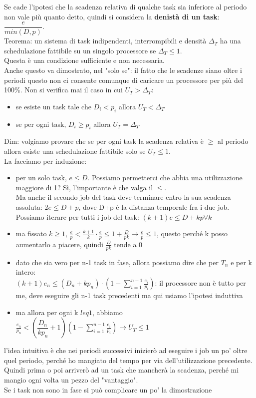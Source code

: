 \documentclass[12pt, oneside]{extbook}
\begin{document}
Se cade l'ipotesi che la scadenza relativa di qualche task sia inferiore al periodo non vale più quanto detto, quindi si considera la \textbf{denistà di un task}: $\dfrac{e}{min(D,p)}$.\\
Teorema: un sistema di task indipendenti, interrompibili e densità $\Delta_T$ ha una schedulazione fattibile su un singolo processore se $\Delta_T \leq 1$.\\
Questa è una condizione sufficiente e non necessaria.\\
Anche questo va dimostrato, nel "solo se": il fatto che le scadenze siano oltre i periodi questo non ci consente comunque di caricare un processore per più del 100\%.
Non si verifica mai il caso in cui $U_T > \Delta_T$:
\begin{itemize}
	\item se esiste un task tale che $D_i < p_i$ allora $U_T < \Delta_T$
	\item se per ogni task, $D_i \geq p_i$ allora $U_T = \Delta_T$
\end{itemize}
Dim: volgiamo provare che se per ogni task la scadenza relativa è $\geq$ al periodo allora esiste una schedulazione fattibile solo se $U_T \leq 1$.\\
La facciamo per induzione:
\begin{itemize}
	\item per un solo task, $e \leq D$. Possiamo permetterci che abbia una utilizzazione maggiore di 1? Sì, l'importante è che valga il $\leq$.\\
	Ma anche il secondo job del task deve terminare entro la sua scadenza assoluta: $2e \leq D + p$, dove D+p è la distanza temporale fra i due job.\\
	Possiamo iterare per tutti i job del task: $(k+1)e \leq D + kp \forall k$
	\item ma fissato $k \geq 1$, $\frac{e}{p} < \frac{k+1}{k} \cdot \frac{e}{p} \leq 1 + \frac{D}{pk} \rightarrow \frac{e}{p} \leq 1$, questo perché k posso aumentarlo a piacere, quindi $\frac{D}{pk}$ tende a 0
	\item dato che sia vero per n-1 task in fase, allora possiamo dire che per $T_n$ e per k intero:\\
	$(k+1)e_n \leq (D_n + k p_n) \cdot (1 - \sum_{i=1}^{n-1} \frac{e_i}{p_i})$: il processore non è tutto per me, deve eseguire gli n-1 task precedenti ma qui usiamo l'ipotesi induttiva
	\item ma allora per ogni k $leq 1$, abbiamo $\frac{e_n}{p_n} < (\dfrac{D_n}{k p_n} + 1) (1 - \sum_{i=1}^{n-1} \frac{e_i}{p_i}) \rightarrow U_T \leq 1$
\end{itemize} 
l'idea intuitiva è che nei periodi successivi inizierò ad eseguire i job un po' oltre quel periodo, perché ho mangiato del tempo per via dell'utilizzazione precedente.\\
Quindi prima o poi arriverò ad un task che mancherà la scadenza, perché mi mangio ogni volta un pezzo del "vantaggio".\\
Se i task non sono in fase si può complicare un po' la dimostrazione
\end{document}
